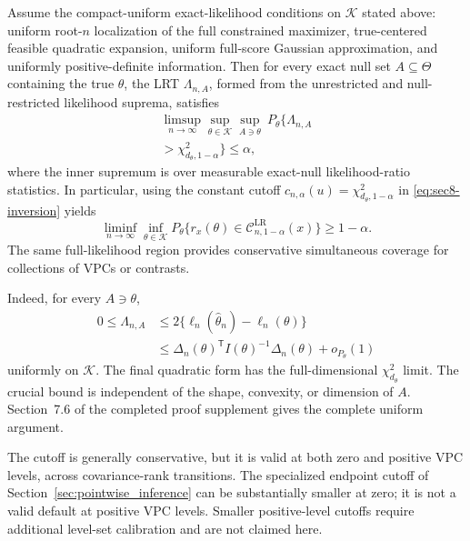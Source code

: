 \begin{theorem}
\label{thm:sec8-lr-universal}
Assume the compact-uniform exact-likelihood conditions on
$\mathcal K$ stated above: uniform root-$n$ localization of the full
constrained maximizer, true-centered feasible quadratic expansion,
uniform full-score Gaussian approximation, and uniformly
positive-definite information. Then for every exact null set
$A\subseteq\Theta$ containing the true $\theta$, the LRT
$\Lambda_{n,A}$, formed from the unrestricted and
null-restricted likelihood suprema, satisfies
\begin{equation}\label{eq:sec8-lr-universal}
\begin{aligned}
\limsup_{n\to\infty}\sup_{\theta\in\mathcal K}
\sup_{A\ni\theta}\ P_\theta\{\Lambda_{n,A}\\
>\chi^2_{d_\theta,1-\alpha}\}\le\alpha,
\end{aligned}
\end{equation}
where the inner supremum is over measurable exact-null
likelihood-ratio statistics. In particular, using the constant
cutoff $c_{n,\alpha}(u)=\chi^2_{d_\theta,1-\alpha}$ in
\eqref{eq:sec8-inversion} yields
\begin{equation}\label{eq:sec8-lr-uniform-coverage}
\liminf_{n\to\infty}\inf_{\theta\in\mathcal K}
P_\theta\{r_x(\theta)\in
\mathcal C_{n,1-\alpha}^{\mathrm{LR}}(x)\}
\ge1-\alpha.
\end{equation}
The same full-likelihood region provides conservative
simultaneous coverage for collections of VPCs or contrasts.
\end{theorem}

Indeed, for every $A\ni\theta$,
\begin{equation}\label{eq:sec8-lr-domination}
\begin{aligned}
0\le\Lambda_{n,A}
&\le2\{\ell_n(\widehat\theta_n)-\ell_n(\theta)\}\\
&\le\Delta_n(\theta)^{\mathsf T}
I(\theta)^{-1}\Delta_n(\theta)+o_{P_\theta}(1)
\end{aligned}
\end{equation}
uniformly on $\mathcal K$. The final quadratic form has the
full-dimensional $\chi^2_{d_\theta}$ limit. The crucial
bound is independent of the shape, convexity, or dimension
of $A$. Section~7.6 of the completed proof supplement gives
the complete uniform argument.

The cutoff is generally conservative, but it is valid at both
zero and positive VPC levels, across covariance-rank transitions.
The specialized endpoint cutoff of Section~\ref{sec:pointwise_inference}
can be substantially smaller at zero; it is not a valid default
at positive VPC levels. Smaller positive-level cutoffs require
additional level-set calibration and are not claimed here.


